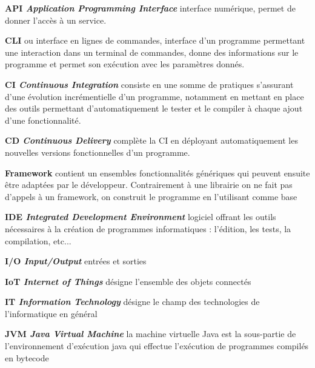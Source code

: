 \documentclass[french,a4paper,12pt]{report}
\begin{document}
\hypertarget{API}{\noindent\textbf{API \emph{Application Programming Interface}} interface numérique, permet de donner l'accès à un service.}

\bigskip

\hypertarget{CLI}{\noindent\textbf{CLI} ou interface en lignes de commandes, interface d'un programme permettant une interaction dans un terminal de commandes, donne des informations sur le programme et permet son exécution avec les paramètres donnés. }

\bigskip

\hypertarget{CI}{\noindent\textbf{CI \emph{Continuous Integration}} consiste en une somme de pratiques s'assurant d'une évolution incrémentielle d'un programme, notamment en mettant en place des outils permettant d'automatiquement le tester et le compiler à chaque ajout d'une fonctionnalité.}

\bigskip

\hypertarget{CD}{\noindent\textbf{CD \emph{Continuous Delivery}} complète la CI en déployant automatiquement les nouvelles versions fonctionnelles d'un programme.} 

\bigskip

\hypertarget{Framework}{\noindent\textbf{Framework} contient un ensembles fonctionnalités génériques qui peuvent ensuite être adaptées par le développeur. Contrairement à une librairie on ne fait pas d'appels à un framework, on construit le programme en l'utilisant comme base}

\bigskip

\hypertarget{IDE}{\noindent\textbf{IDE \emph{Integrated Development Environment}} logiciel offrant les outils nécessaires à la création de programmes informatiques : l'édition, les tests, la compilation, etc...}

\bigskip

\hypertarget{IO}{\noindent\textbf{I/O \emph{Input/Output}} entrées et sorties}

\bigskip

\hypertarget{IoT}{\noindent\textbf{IoT \emph{Internet of Things}} désigne l'ensemble des objets connectés} 

\bigskip

\hypertarget{IT}{\noindent\textbf{IT \emph{Information Technology}} désigne le champ des technologies de l'informatique en général}

\bigskip

\hypertarget{JVM}{\noindent\textbf{JVM \emph{Java Virtual Machine}} la machine virtuelle Java est la sous-partie de l’environnement d’exécution java qui effectue l’exécution de programmes compilés en bytecode}
\end{document}
